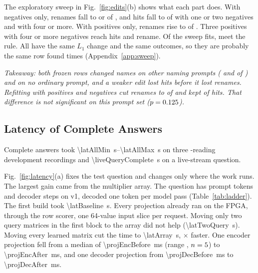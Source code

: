 \documentclass[conference,10pt,letterpaper]{IEEEtran}
\newcommand{\seconds}[1]{\SI{#1}{\second}}
\newcommand{\secrange}[2]{\SIrange{#1}{#2}{\second}}
\newcommand{\ms}[1]{\SI{#1}{\milli\second}}
\begin{document}
The exploratory sweep in Fig.~\ref{fig:edits}(b) shows what each part does. With negatives only, renames fall to \sweepNegOnlyLeaksMin{} or \sweepNegOnlyLeaksMax{} of \extNaming, and hits fall to \sweepNegFewHits{} of \extTargets{} with one or two negatives and \sweepNegOnlyHits{} with four or more. With positives only, renames rise to \sweepPosOnlyLeaks{} of \extNaming. Three positives with four or more negatives reach \sweepBestHits{} hits and \sweepBestLeaks{} rename. Of the \sweepFits{} sweep fits, \sweepPassing{} meet the rule. All \sweepPassing{} have the same $L_1$ change and the same outcomes, so they are probably the same row found \sweepPassing{} times (Appendix~\ref{app:sweep}).

\textit{Takeaway: both frozen rows changed names on other naming prompts (\conventionalLeaks{} and \astraLeaks{} of \extNaming) and on no ordinary prompt, and a weaker edit lost hits before it lost renames. Refitting with \positiveAuthoring{} positives and \negativeAuthoring{} negatives cut renames to \contrastiveLeaks{} of \extNaming{} and kept \contrastiveHits{} of \extTargets{} hits. That difference is not significant on this prompt set ($p=0.125$).}

\subsection{Latency of Complete Answers}
\label{sec:latency}
Complete answers took \secrange{\latAllMin}{\latAllMax} on three \recordingReadings-reading development recordings and \seconds{\liveQueryComplete} on a live-stream question.

Fig.~\ref{fig:latency}(a) fixes the test question and changes only where the work runs. The largest gain came from the multiplier array. The question has \promptTokens{} prompt tokens and \decoderSteps{} decoder steps on v1, decoded one token per model pass (Table~\ref{tab:ladder}). The first build took \seconds{\latBaseline}. Every projection already ran on the FPGA, through the row scorer, one 64-value input slice per request. Moving only two query matrices in the first block to the array did not help (\seconds{\latTwoQuery}). Moving every learned matrix cut the time to \seconds{\latArray}, \latArraySpeedup$\times$ faster. One encoder projection fell from a median of \ms{\projEncBefore} (range \projEncBeforeRange, $n=5$) to \ms{\projEncAfter}, and one decoder projection from \ms{\projDecBefore} to \ms{\projDecAfter}.
\end{document}
